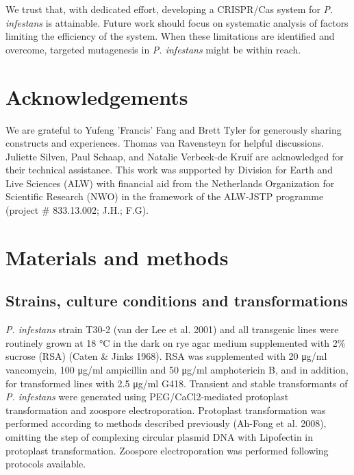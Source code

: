 \documentclass[onecolumn, 11pt,openany]{memoir}
\begin{document}
\begin{multicols}{2}
We trust that, with dedicated effort, developing a CRISPR/Cas system for \textit{P. infestans} is attainable. Future work should focus on systematic analysis of factors limiting the efficiency of the system. When these limitations are identified and overcome, targeted mutagenesis in \textit{P. infestans} might be within reach.

\section{Acknowledgements}
We are grateful to Yufeng 'Francis' Fang and Brett Tyler for generously sharing constructs and experiences. Thomas van Ravensteyn for helpful discussions. Juliette Silven, Paul Schaap, and Natalie Verbeek-de Kruif are acknowledged for their technical assistance. This work was supported by Division for Earth and Live Sciences (ALW) with financial aid from the Netherlands Organization for Scientific Research (NWO) in the framework of the ALW-JSTP programme (project \# 833.13.002; J.H.; F.G).

\section{Materials and methods}

\begin{footnotesize}

\subsection{Strains, culture conditions and transformations}
\textit{P. infestans} strain T30-2 (van der Lee et al. 2001) and all transgenic lines were routinely grown at 18 °C in the dark on rye agar medium supplemented with 2\% sucrose (RSA) (Caten \& Jinks 1968). RSA was supplemented with 20 μg/ml vancomycin, 100 μg/ml ampicillin and 50 μg/ml amphotericin B, and in addition, for transformed lines with 2.5 μg/ml G418. Transient and stable transformants of \textit{P. infestans} were generated using PEG/CaCl2-mediated protoplast transformation and zoospore electroporation. Protoplast transformation was performed according to methods described previously (Ah-Fong et al. 2008), omitting the step of complexing circular plasmid DNA with Lipofectin in protoplast transformation. Zoospore electroporation was performed following protocols available. 


\end{footnotesize}
\end{multicols}
\end{document}
